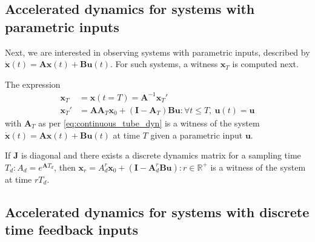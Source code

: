\documentclass[sigconf]{llncs}
\newcommand{\mat}[1]{\boldsymbol{#1}}
\renewcommand{\vec}[1]{\boldsymbol{#1}}
\begin{document}
 \subsection{Accelerated dynamics for systems with parametric inputs}\label{sec:real_discrete_param_inputs}
 Next, we are interested in observing systems with parametric
 inputs, described by $\dot{\vec{x}}(t)=\mat{A}\vec{x}(t)+\mat{B}\vec{u}(t)$.
 For such systems, a witness $\vec{x}_T$ is computed next.
\begin{theorem}
The expression
 \begin{align}
 \vec{x}_T&=\vec{x}(t=T)=\mat{A}^{-1}\vec{x}_T'\nonumber\\
\vec{x}_T'&=\mat{A}\mat{A}_T\vec{x}_0 + (\mat{I}-\mat{A}_T)\mat{B}\vec{u} : \forall t \leq T,\ \vec{u}(t)=\vec{u} 
 \end{align}
 with $\mat{A}_T$ as per \eqref{eq:continuous_tube_dyn} is a witness of the system $\dot{\vec{x}}(t)=\mat{A}\vec{x}(t)+\mat{B}\vec{u}(t)$ at time $T$ given a parametric input $\vec{u}$.
\end{theorem}
 \begin{corollary}
 If $\mat{J}$ is diagonal and there exists a discrete dynamics matrix for a sampling time $T_d :  A_d=e^{\mat{A} T_d}$, then $\vec{x}_r=A_d^r\vec{x}_0+(\mat{I}-\mat{A}_d^r\mat{B}\vec{u}) : r \in \mathbb{R}^+$ is a witness of the system at time $rT_d$.
 \end{corollary}

 \subsection{Accelerated dynamics for systems with discrete time feedback inputs}\label{sec:real_discrete_feedback_inputs}
\end{document}
